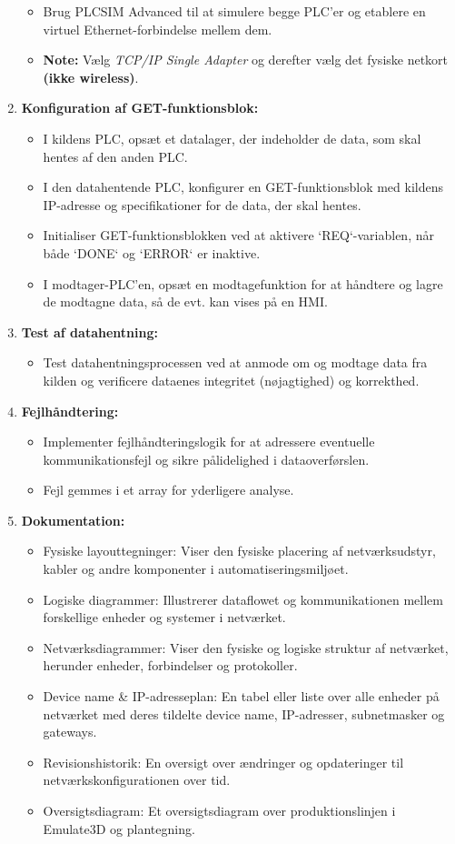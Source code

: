 \begin{enumerate}
\begin{itemize}
		\item Brug PLCSIM Advanced til at simulere begge PLC'er og etablere en virtuel Ethernet-forbindelse mellem dem.
		\item \textbf{Note:} Vælg \textit{TCP/IP Single Adapter} og derefter vælg det fysiske netkort \textbf{(ikke wireless)}.
	\end{itemize}
	\item \textbf{Konfiguration af GET-funktionsblok:}
	\begin{itemize}
		\item I kildens PLC, opsæt et datalager, der indeholder de data, som skal hentes af den anden PLC.
		\item I den datahentende PLC, konfigurer en GET-funktionsblok med kildens IP-adresse og specifikationer for de data, der skal hentes.
		\item Initialiser GET-funktionsblokken ved at aktivere `REQ`-variablen, når både `DONE` og `ERROR` er inaktive.
		\item I modtager-PLC'en, opsæt en modtagefunktion for at håndtere og lagre de modtagne data, så de evt. kan vises på en HMI.
	\end{itemize}
	\item \textbf{Test af datahentning:}
	\begin{itemize}
		\item Test datahentningsprocessen ved at anmode om og modtage data fra kilden og verificere dataenes integritet (nøjagtighed) og korrekthed.
	\end{itemize}
	\item \textbf{Fejlhåndtering:}
	\begin{itemize}
		\item Implementer fejlhåndteringslogik for at adressere eventuelle kommunikationsfejl og sikre pålidelighed i dataoverførslen.
		\item Fejl gemmes i et array for yderligere analyse.
	\end{itemize}
	\item \textbf{Dokumentation:}
	\begin{itemize}
		\item Fysiske layouttegninger: Viser den fysiske placering af netværksudstyr, kabler og andre komponenter i automatiseringsmiljøet.
		\item Logiske diagrammer: Illustrerer dataflowet og kommunikationen mellem forskellige enheder og systemer i netværket.
		\item Netværksdiagrammer: Viser den fysiske og logiske struktur af netværket, herunder enheder, forbindelser og protokoller.
		\item Device name \& IP-adresseplan: En tabel eller liste over alle enheder på netværket med deres tildelte device name, IP-adresser, subnetmasker og gateways.
		\item Revisionshistorik: En oversigt over ændringer og opdateringer til netværkskonfigurationen over tid.
		\item Oversigtsdiagram: Et oversigtsdiagram over produktionslinjen i Emulate3D og plantegning.
	\end{itemize}
\end{enumerate}

